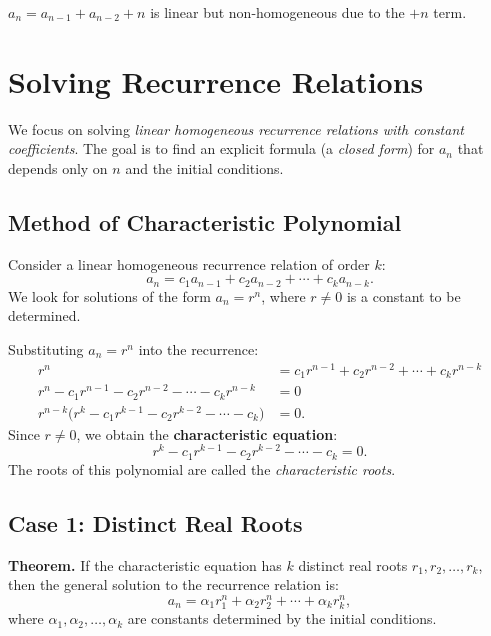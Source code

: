 \documentclass[11pt,a4paper]{article}
\begin{document}
\begin{example}
$a_n = a_{n-1} + a_{n-2} + n$ is linear but non-homogeneous due to the $+n$ term.
\end{example}

\section{Solving Recurrence Relations}

We focus on solving \textit{linear homogeneous recurrence relations with constant coefficients}. The goal is to find an explicit formula (a \textit{closed form}) for $a_n$ that depends only on $n$ and the initial conditions.

\subsection{Method of Characteristic Polynomial}

Consider a linear homogeneous recurrence relation of order $k$:
\begin{equation*}
    a_n = c_1 a_{n-1} + c_2 a_{n-2} + \cdots + c_k a_{n-k}.
\end{equation*}
We look for solutions of the form $a_n = r^n$, where $r \neq 0$ is a constant to be determined.

Substituting $a_n = r^n$ into the recurrence:
\begin{align*}
    r^n &= c_1 r^{n-1} + c_2 r^{n-2} + \cdots + c_k r^{n-k} \\
    r^n - c_1 r^{n-1} - c_2 r^{n-2} - \cdots - c_k r^{n-k} &= 0 \\
    r^{n-k}\bigl(r^k - c_1 r^{k-1} - c_2 r^{k-2} - \cdots - c_k\bigr) &= 0.
\end{align*}
Since $r \neq 0$, we obtain the \textbf{characteristic equation}:
\begin{equation*}
    r^k - c_1 r^{k-1} - c_2 r^{k-2} - \cdots - c_k = 0.
\end{equation*}
The roots of this polynomial are called the \textit{characteristic roots}.

\subsection{Case 1: Distinct Real Roots}

\textbf{Theorem.} If the characteristic equation has $k$ distinct real roots $r_1, r_2, \dots, r_k$, then the general solution to the recurrence relation is:
\begin{equation*}
    a_n = \alpha_1 r_1^n + \alpha_2 r_2^n + \cdots + \alpha_k r_k^n,
\end{equation*}
where $\alpha_1, \alpha_2, \dots, \alpha_k$ are constants determined by the initial conditions.
\end{document}
